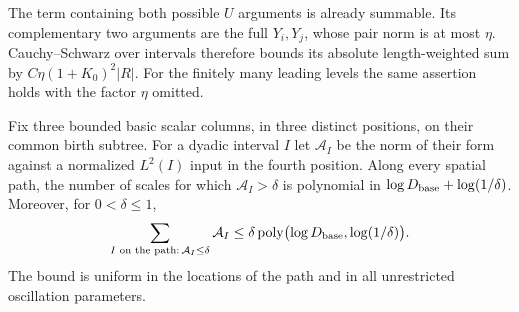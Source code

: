 The term containing both possible $U$ arguments is
already summable.  Its complementary two arguments
are the full $Y_i,Y_j$, whose pair norm is at most
$\eta$.  Cauchy--Schwarz over intervals therefore
bounds its absolute length-weighted sum by
$C\eta(1+K_0)^2|R|$.  For the finitely many leading
levels the same assertion holds with the factor
$\eta$ omitted.

\begin{lemma}
\label{lem:active-triple}
Fix three bounded basic scalar columns, in three
distinct positions, on their common birth subtree.
For a dyadic interval $I$ let $\mathcal A_I$ be the
norm of their form against a normalized $L^2(I)$
input in the fourth position.  Along every spatial
path, the number of scales for which
$\mathcal A_I>\delta$ is polynomial in
$\log D_{\rm base}+\log(1/\delta)$.
Moreover, for $0<\delta\le1$,
\[
 \sum_{I\text{ on the path}:\,\mathcal A_I\le\delta}
          \mathcal A_I
 \le \delta\operatorname{poly}
              \bigl(\log D_{\rm base},\log(1/\delta)\bigr).
\]
The bound is uniform in the locations of the path
and in all unrestricted oscillation parameters.
\end{lemma}

